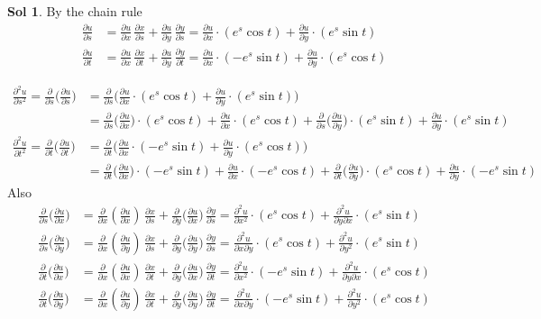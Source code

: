 \documentclass[12pt]{extarticle}
\theoremstyle{definition}
\newtheorem*{sol}{Sol}
\newcommand{\pdiff}[2]{\frac{\partial #1}{\partial #2}}
\newcommand{\pdifft}[2]{\frac{\partial^2 #1}{\partial #2^2}}
\begin{document}
\begin{sol} By the chain rule
  \begin{align*}
    \pdiff{u}{s} &= \pdiff{u}{x}\,\pdiff{x}{s} + \pdiff{u}{y}\,\pdiff{y}{s} = \pdiff{u}{x}\cdot(e^s\cos t) + \pdiff{u}{y}\cdot(e^s\sin t)\\
    \pdiff{u}{t} &= \pdiff{u}{x}\,\pdiff{x}{t} + \pdiff{u}{y}\,\pdiff{y}{t} = \pdiff{u}{x}\cdot(-e^s\sin t) + \pdiff{u}{y}\cdot(e^s\cos t) 
  \end{align*}

  \begin{align*}
    \pdifft{u}{s} = \pdiff{}{s}\bigg(\pdiff{u}{s}\bigg) &= \pdiff{}{s}\bigg(\pdiff{u}{x}\cdot(e^s\cos t) + \pdiff{u}{y}\cdot(e^s\sin t)\bigg)\\
    &= \pdiff{}{s}\bigg(\pdiff{u}{x}\bigg)\cdot(e^s\cos t) + \pdiff{u}{x}\cdot(e^s\cos t) + \pdiff{}{s}\bigg(\pdiff{u}{y}\bigg)\cdot(e^s\sin t) + \pdiff{u}{y}\cdot(e^s\sin t) \\
    \pdifft{u}{t} = \pdiff{}{t}\bigg(\pdiff{u}{t}\bigg) &= \pdiff{}{t}\bigg(\pdiff{u}{x}\cdot(-e^s\sin t) + \pdiff{u}{y}\cdot(e^s\cos t)\bigg)\\
    &= \pdiff{}{t}\bigg(\pdiff{u}{x}\bigg)\cdot(-e^s\sin t) + \pdiff{u}{x}\cdot(-e^s\cos t) + \pdiff{}{t}\bigg(\pdiff{u}{y}\bigg)\cdot(e^s\cos t) + \pdiff{u}{y}\cdot(-e^s\sin t)
  \end{align*}
  Also
  \begin{align*}
    \pdiff{}{s}\bigg(\pdiff{u}{x}\bigg) &= \pdiff{}{x}\left(\pdiff{u}{x}\right)\,\pdiff{x}{s} + \pdiff{}{y}\bigg(\pdiff{u}{x}\bigg)\,\pdiff{y}{s} = \pdifft{u}{x}\cdot(e^s\cos t) + \frac{\partial^2 u}{\partial y\partial x}\cdot(e^s\sin t)\\
  \pdiff{}{s}\bigg(\pdiff{u}{y}\bigg) &= \pdiff{}{x}\left(\pdiff{u}{y}\right)\,\pdiff{x}{s} + \pdiff{}{y}\bigg(\pdiff{u}{y}\bigg)\,\pdiff{y}{s} = \frac{\partial^2 u}{\partial x\partial y}\cdot(e^s\cos t) + \pdifft{u}{y}\cdot(e^s\sin t) \\
    \pdiff{}{t}\bigg(\pdiff{u}{x}\bigg) &= \pdiff{}{x}\left(\pdiff{u}{x}\right)\,\pdiff{x}{t} + \pdiff{}{y}\bigg(\pdiff{u}{x}\bigg)\,\pdiff{y}{t} = \pdifft{u}{x}\cdot(-e^s\sin t) + \frac{\partial^2 u}{\partial y\partial x}\cdot(e^s\cos t)\\
  \pdiff{}{t}\bigg(\pdiff{u}{y}\bigg) &= \pdiff{}{x}\left(\pdiff{u}{y}\right)\,\pdiff{x}{t} + \pdiff{}{y}\bigg(\pdiff{u}{y}\bigg)\,\pdiff{y}{t} = \frac{\partial^2 u}{\partial x\partial y}\cdot(-e^s\sin t) + \pdifft{u}{y}\cdot(e^s\cos t)
  \end{align*}

\end{sol}
\end{document}
